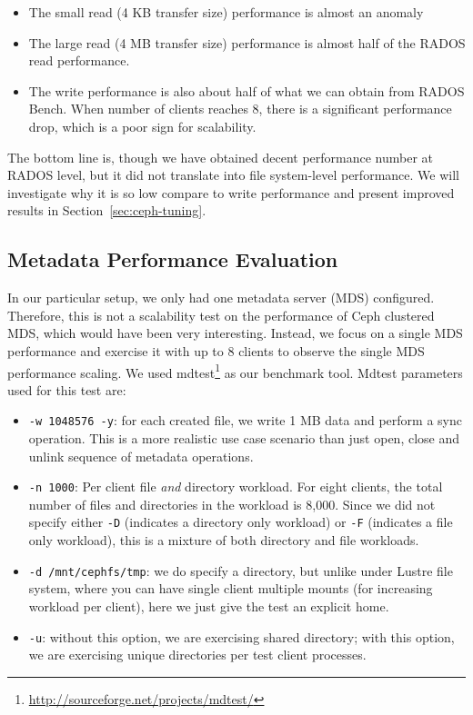 \begin{itemize}

  \item The small read (4 KB transfer size) performance is almost an anomaly

  \item The large read (4 MB transfer size) performance is almost half of the
  RADOS read performance.
   
  \item The write performance is also about half of what we can obtain from
  RADOS Bench. When number of clients reaches 8, there is a significant
  performance drop, which is a poor sign for scalability. 

\end{itemize}

The bottom line is, though we have obtained decent performance number at RADOS
level, but it did not translate into file system-level performance. We will
investigate why it is so low compare to write performance and present improved
results in Section~\ref{sec:ceph-tuning}.


\subsection{Metadata Performance Evaluation}


In our particular setup, we only had one metadata server (MDS) configured.
Therefore, this is not a scalability test on the performance of Ceph clustered
MDS, which would have been very interesting.  Instead, we focus on a single MDS
performance and exercise it with up to 8 clients to observe the single MDS
performance scaling. We used
mdtest\footnote{\url{http://sourceforge.net/projects/mdtest/}} as our benchmark
tool. Mdtest parameters used for this test are:

\begin{itemize}
\item \verb!-w 1048576 -y!: for each created file, we write 1 MB data and
perform a sync operation.  This is a more realistic use case scenario than just
open, close and unlink sequence of metadata operations.

\item \verb!-n 1000!: Per client file \textit{and} directory workload. For
eight clients, the total number of files and directories in the workload is
8,000. Since we did not specify either \verb!-D! (indicates a directory only
workload) or \verb!-F! (indicates a file only workload), this is a mixture of
both directory and file workloads.

\item \verb!-d /mnt/cephfs/tmp!: we do specify a directory, but unlike under
Lustre file system, where you can have single client multiple mounts (for
increasing workload per client), here we just give the test an explicit home.

\item \verb!-u!: without this option, we are exercising shared directory; with
this option, we are exercising unique directories per test client processes.

\end{itemize}

